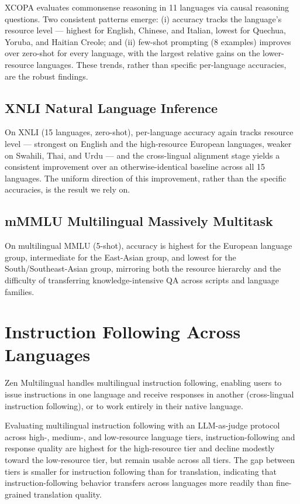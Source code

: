 \documentclass[11pt,a4paper]{article}
\begin{document}
XCOPA evaluates commonsense reasoning in 11 languages via causal reasoning questions. Two
consistent patterns emerge: (i) accuracy tracks the language's resource level — highest
for English, Chinese, and Italian, lowest for Quechua, Yoruba, and Haitian Creole; and
(ii) few-shot prompting (8 examples) improves over zero-shot for every language, with the
largest relative gains on the lower-resource languages. These trends, rather than specific
per-language accuracies, are the robust findings.

\subsection{XNLI Natural Language Inference}

On XNLI (15 languages, zero-shot), per-language accuracy again tracks resource level —
strongest on English and the high-resource European languages, weaker on Swahili, Thai,
and Urdu — and the cross-lingual alignment stage yields a consistent improvement over an
otherwise-identical baseline across all 15 languages. The uniform direction of this
improvement, rather than the specific accuracies, is the result we rely on.

\subsection{mMMLU Multilingual Massively Multitask}

On multilingual MMLU (5-shot), accuracy is highest for the European language group,
intermediate for the East-Asian group, and lowest for the South/Southeast-Asian group,
mirroring both the resource hierarchy and the difficulty of transferring
knowledge-intensive QA across scripts and language families.

\section{Instruction Following Across Languages}

Zen Multilingual handles multilingual instruction following, enabling users to issue instructions in one language and receive responses in another (cross-lingual instruction following), or to work entirely in their native language.

Evaluating multilingual instruction following with an LLM-as-judge protocol across
high-, medium-, and low-resource language tiers, instruction-following and response
quality are highest for the high-resource tier and decline modestly toward the
low-resource tier, but remain usable across all tiers. The gap between tiers is smaller
for instruction following than for translation, indicating that instruction-following
behavior transfers across languages more readily than fine-grained translation quality.
\end{document}
